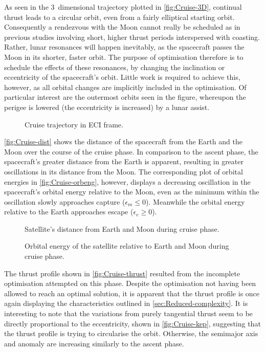 As seen in the 3~dimensional trajectory plotted in \autoref{fig:Cruise-3D}, continual thrust leads to a circular orbit, even from a fairly elliptical starting orbit. Consequently a rendezvous with the Moon cannot really be scheduled as in previous studies involving short, higher thrust periods interspersed with coasting. Rather, lunar resonances will happen inevitably, as the spacecraft passes the Moon in its shorter, faster orbit. The purpose of optimisation therefore is to schedule the effects of these resonances, by changing the inclination or eccentricity of the spacecraft's orbit. Little work is required to achieve this, however, as all orbital changes are implicitly included in the optimisation. Of particular interest are the outermost orbits seen in the figure, whereupon the perigee is lowered (the eccentricity is increased) by a lunar assist.

\begin{figure}
\caption{Cruise trajectory in ECI frame.}
\label{fig:Cruise-3D}
\centering
\def\svgwidth{\figurewidth}

\end{figure}

\autoref{fig:Cruise-dist} shows the distance of the spacecraft from the Earth and the Moon over the course of the cruise phase. In comparison to the ascent phase, the spacecraft's greater distance from the Earth is apparent, resulting in greater oscillations in its distance from the Moon. The corresponding plot of orbital energies in \autoref{fig:Cruise-orbeng}, however, displays a decreasing oscillation in the spacecraft's orbital energy relative to the Moon, even as the minimum within the oscillation slowly approaches capture ($\epsilon_m\le0$). Meanwhile the orbital energy relative to the Earth approaches escape ($\epsilon_e\ge0$). 

\begin{figure}
\caption{Satellite's distance from Earth and Moon during cruise phase.}
\label{fig:Cruise-dist}
\centering
\def\svgwidth{\figurewidth}

\end{figure}

\begin{figure}
\caption{Orbital energy of the satellite relative to Earth and Moon during cruise phase.}
\label{fig:Cruise-orbeng}
\centering
\def\svgwidth{\figurewidth}

\end{figure}

The thrust profile shown in \autoref{fig:Cruise-thrust} resulted from the incomplete optimisation attempted on this phase. Despite the optimisation not having been allowed to reach an optimal solution, it is apparent that the thrust profile is once again displaying the characteristics outlined in \autoref{sec:Reduced-complexity}. It is interesting to note that the variations from purely tangential thrust seem to be directly proportional to the eccentricity, shown in \autoref{fig:Cruise-kep}, suggesting that the thrust profile is trying to circularise the orbit. Otherwise, the semimajor axis and anomaly are increasing similarly to the ascent phase.

